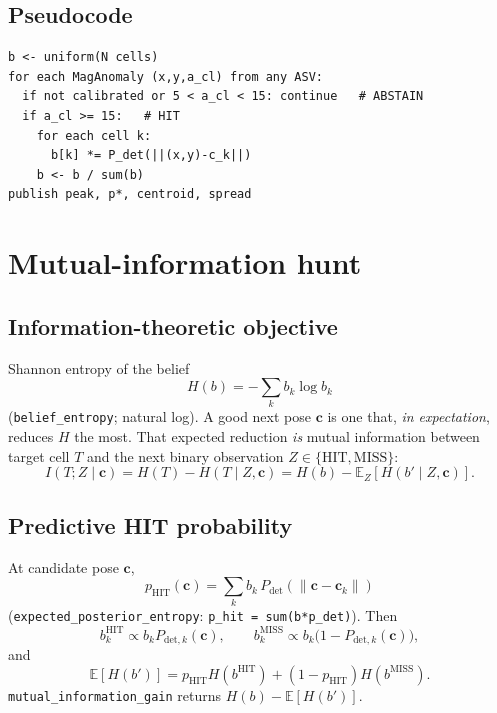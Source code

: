 \documentclass[11pt,a4paper]{article}
\begin{document}
\subsection{Pseudocode}
\begin{lstlisting}
b <- uniform(N cells)
for each MagAnomaly (x,y,a_cl) from any ASV:
  if not calibrated or 5 < a_cl < 15: continue   # ABSTAIN
  if a_cl >= 15:   # HIT
    for each cell k:
      b[k] *= P_det(||(x,y)-c_k||)
    b <- b / sum(b)
publish peak, p*, centroid, spread
\end{lstlisting}

\section{Mutual-information hunt}
\label{sec:mi}

\subsection{Information-theoretic objective}
Shannon entropy of the belief
\[
H(b)=-\sum_{k} b_k\log b_k
\]
(\texttt{belief\_entropy}; natural log). A good next pose \(\mathbf{c}\) is one
that, \emph{in expectation}, reduces \(H\) the most. That expected reduction
\emph{is} mutual information between target cell \(T\) and the next binary
observation \(Z\in\{\mathrm{HIT},\mathrm{MISS}\}\):
\begin{equation}
\label{eq:mi}
I(T;Z\mid\mathbf{c})
=H(T)-H(T\mid Z,\mathbf{c})
=H(b)-\mathbb{E}_{Z}\!\left[H(b'\mid Z,\mathbf{c})\right].
\end{equation}

\subsection{Predictive HIT probability}
At candidate pose \(\mathbf{c}\),
\[
p_{\mathrm{HIT}}(\mathbf{c})
=\sum_{k} b_k\, P_{\mathrm{det}}(\lVert\mathbf{c}-\mathbf{c}_k\rVert)
\]
(\texttt{expected\_posterior\_entropy}: \texttt{p\_hit = sum(b*p\_det)}).
Then
\[
b^{\mathrm{HIT}}_k \propto b_k P_{\mathrm{det},k}(\mathbf{c}),\qquad
b^{\mathrm{MISS}}_k \propto b_k\bigl(1-P_{\mathrm{det},k}(\mathbf{c})\bigr),
\]
and
\[
\mathbb{E}[H(b')]
= p_{\mathrm{HIT}} H(b^{\mathrm{HIT}})
+(1-p_{\mathrm{HIT}}) H(b^{\mathrm{MISS}}).
\]
\texttt{mutual\_information\_gain} returns \(H(b)-\mathbb{E}[H(b')]\).
\end{document}
